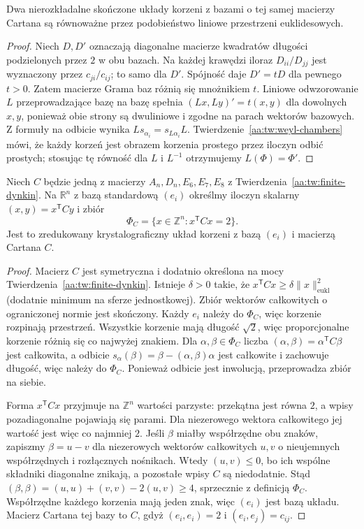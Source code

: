 \begin{twierdzenie}
\label{aa:tw:root-uniqueness}
Dwa nierozkładalne skończone układy korzeni z bazami
o tej samej macierzy Cartana są równoważne przez
podobieństwo liniowe przestrzeni euklidesowych.
\end{twierdzenie}
\begin{proof}
Niech $D,D'$ oznaczają diagonalne macierze kwadratów
długości podzielonych przez $2$ w obu bazach.
Na każdej krawędzi iloraz $D_{ii}/D_{jj}$ jest
wyznaczony przez $c_{ji}/c_{ij}$; to samo dla $D'$.
Spójność daje $D'=tD$ dla pewnego $t>0$.
Zatem macierze Grama baz różnią się mnożnikiem $t$.
Liniowe odwzorowanie $L$ przeprowadzające bazę
na bazę spełnia $(Lx,Ly)'=t(x,y)$ dla dowolnych
$x,y$, ponieważ obie strony są dwuliniowe i
zgodne na parach wektorów bazowych.
Z formuły na odbicie wynika
$Ls_{\alpha_i}=s_{L\alpha_i}L$.
Twierdzenie~\ref{aa:tw:weyl-chambers} mówi,
że każdy korzeń jest obrazem korzenia prostego
przez iloczyn odbić prostych; stosując tę równość
dla $L$ i $L^{-1}$ otrzymujemy $L(\Phi)=\Phi'$.
\end{proof}

\begin{twierdzenie}
\label{aa:tw:simply-laced-realization}
Niech $C$ będzie jedną z macierzy $A_n,D_n,E_6,E_7,E_8$
z Twierdzenia~\ref{aa:tw:finite-dynkin}. Na $\mathbb R^n$
z bazą standardową $(e_i)$ określmy iloczyn skalarny
$(x,y)=x^{\mathsf T}Cy$ i zbiór
\[
 \Phi_C=\{x\in\mathbb Z^n:x^{\mathsf T}Cx=2\}.
\]
Jest to zredukowany krystalograficzny układ korzeni
z bazą $(e_i)$ i macierzą Cartana $C$.
\end{twierdzenie}
\begin{proof}
Macierz $C$ jest symetryczna i dodatnio określona
na mocy Twierdzenia~\ref{aa:tw:finite-dynkin}.
Istnieje $\delta>0$ takie, że
$x^{\mathsf T}Cx\ge\delta\|x\|_{\mathrm{eukl}}^2$
(dodatnie minimum na sferze jednostkowej).
Zbiór wektorów całkowitych o ograniczonej normie
jest skończony. Każdy $e_i$ należy do $\Phi_C$,
więc korzenie rozpinają przestrzeń.
Wszystkie korzenie mają długość $\sqrt2$,
więc proporcjonalne korzenie różnią się co najwyżej
znakiem. Dla $\alpha,\beta\in\Phi_C$ liczba
$(\alpha,\beta)=\alpha^{\mathsf T}C\beta$ jest całkowita,
a odbicie $s_\alpha(\beta)=\beta-(\alpha,\beta)\alpha$
jest całkowite i zachowuje długość, więc należy
do $\Phi_C$. Ponieważ odbicie jest inwolucją,
przeprowadza zbiór na siebie.

Forma $x^{\mathsf T}Cx$ przyjmuje na $\mathbb Z^n$
wartości parzyste: przekątna jest równa $2$,
a wpisy pozadiagonalne pojawiają się parami.
Dla niezerowego wektora całkowitego jej wartość
jest więc co najmniej $2$.
Jeśli $\beta$ miałby współrzędne obu znaków,
zapiszmy $\beta=u-v$ dla niezerowych wektorów
całkowitych $u,v$ o nieujemnych współrzędnych
i rozłącznych nośnikach. Wtedy
$(u,v)\le0$, bo ich wspólne składniki diagonalne
znikają, a pozostałe wpisy $C$ są niedodatnie.
Stąd $(\beta,\beta)=(u,u)+(v,v)-2(u,v)\ge4$,
sprzecznie z definicją $\Phi_C$.
Współrzędne każdego korzenia mają jeden znak,
więc $(e_i)$ jest bazą układu.
Macierz Cartana tej bazy to $C$, gdyż
$(e_i,e_i)=2$ i $(e_i,e_j)=c_{ij}$.
\end{proof}

